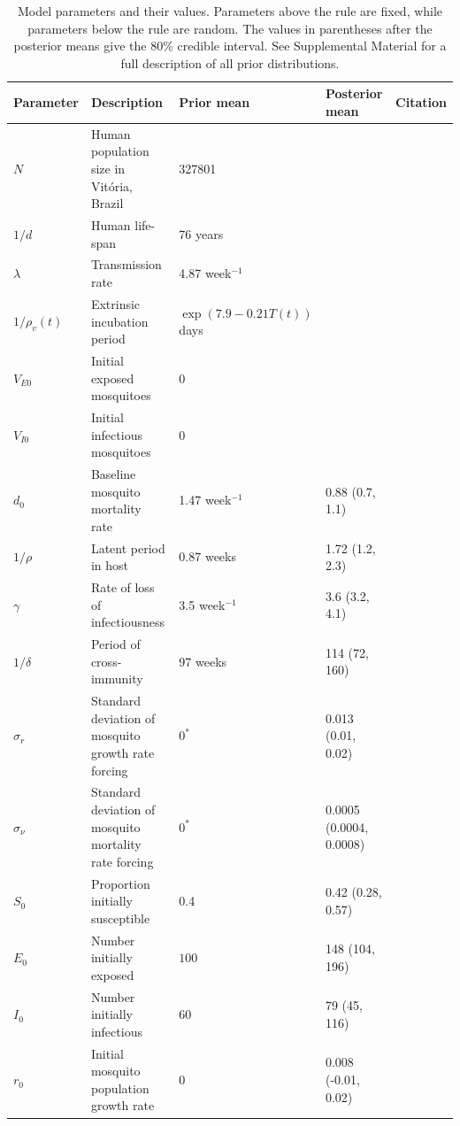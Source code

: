\documentclass[10pt,letterpaper]{article}
\begin{document}
\begin{table}[!ht]
\label{parameters}
\begin{adjustwidth}{-2.25in}{0in} 
\begin{center}
\caption{Model parameters and their values.  Parameters above the rule are fixed, while parameters below the rule are random.  The values in parentheses after the posterior means give the 80$\%$ credible interval. See Supplemental Material for a full description of all prior distributions.}
\begin{tabular}{lp{6cm}lll}
Parameter & Description & Prior mean & Posterior mean & Citation\\
\hline
$N$ & Human population size in Vit\'oria, Brazil & 327801 & & \cite{vitpop} \\
$1/d$ & Human life-span & 76 years & &\cite{vitlong} \\
$\lambda$ & Transmission rate & 4.87 week$^{-1}$ & & \cite{Scott2000}\\
$1/\rho_{v}(t)$ & Extrinsic incubation period & $\exp\left(7.9 - 0.21 T(t) \right)$ days & & \cite{Chan2012}\\
$V_{E0}$ & Initial exposed mosquitoes &  0 & &\\
$V_{I0}$ & Initial infectious mosquitoes & 0 & &\\
\hline
$d_0$ & Baseline mosquito mortality rate & 1.47 week$^{-1}$ & 0.88 (0.7, 1.1) &  \cite{Brady2013} \\
$1/\rho$ & Latent period in host & 0.87 weeks  & 1.72 (1.2, 2.3) &  \cite{Chan2012}\\
$\gamma$ & Rate of loss of infectiousness & 3.5 week$^{-1}$ & 3.6 (3.2, 4.1) & \cite{Nguyet2013}\\
$1/\delta$ & Period of cross-immunity & 97 weeks &  114 (72, 160) & \cite{Reich2013}\\
$\sigma_r$ & Standard deviation of mosquito growth rate forcing & $0^*$ & 0.013 (0.01, 0.02) &\\
$\sigma_{\nu}$ & Standard deviation of mosquito mortality rate forcing & $0^*$ & 0.0005 (0.0004, 0.0008) & \\
$S_0$ & Proportion initially susceptible & 0.4 & 0.42 (0.28, 0.57)& \cite{Cardoso2011a} \\
$E_0$ & Number initially exposed & $100$ & 148 (104, 196) & \\
$I_0$ & Number initially infectious & $60$ & 79 (45, 116) &\\
$r_0$ & Initial mosquito population growth rate & 0 & 0.008 (-0.01, 0.02) &\\

\end{tabular}
\end{center}
\end{adjustwidth}
\end{table}
\end{document}
